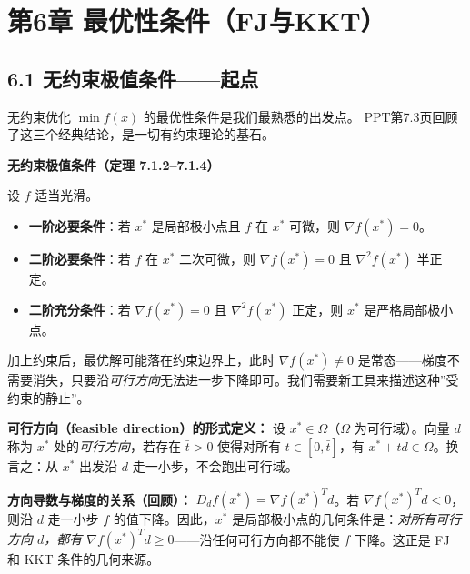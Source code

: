 \section{第6章 \quad 最优性条件（FJ与KKT）}

\subsection{6.1 无约束极值条件——起点}

无约束优化 $\min f(x)$ 的最优性条件是我们最熟悉的出发点。
PPT第7.3页回顾了这三个经典结论，是一切有约束理论的基石。

\medskip
{}
\medskip

\begin{defbox}
\textbf{无约束极值条件（定理 7.1.2--7.1.4）}

设 $f$ 适当光滑。
\begin{itemize}
  \item \textbf{一阶必要条件}：若 $x^*$ 是局部极小点且 $f$ 在 $x^*$ 可微，则 $\nabla f(x^*) = 0$。
  \item \textbf{二阶必要条件}：若 $f$ 在 $x^*$ 二次可微，则 $\nabla f(x^*)=0$ 且 $\nabla^2 f(x^*)$ 半正定。
  \item \textbf{二阶充分条件}：若 $\nabla f(x^*)=0$ 且 $\nabla^2 f(x^*)$ 正定，则 $x^*$ 是严格局部极小点。
\end{itemize}
\end{defbox}

加上约束后，最优解可能落在约束边界上，此时 $\nabla f(x^*) \neq 0$ 是常态——梯度不需要消失，只要沿\emph{可行方向}无法进一步下降即可。我们需要新工具来描述这种”受约束的静止”。

\smallskip
\textbf{可行方向（feasible direction）的形式定义：} 设 $x^*\in\Omega$（$\Omega$ 为可行域）。向量 $d$ 称为 $x^*$ 处的\emph{可行方向}，若存在 $\bar{t}>0$ 使得对所有 $t\in[0,\bar{t}]$，有 $x^*+td\in\Omega$。换言之：从 $x^*$ 出发沿 $d$ 走一小步，不会跑出可行域。

\textbf{方向导数与梯度的关系（回顾）：} $D_d f(x^*)=\nabla f(x^*)^T d$。若 $\nabla f(x^*)^T d < 0$，则沿 $d$ 走一小步 $f$ 的值下降。因此，$x^*$ 是局部极小点的几何条件是：\emph{对所有可行方向 $d$，都有 $\nabla f(x^*)^T d \ge 0$}——沿任何可行方向都不能使 $f$ 下降。这正是 FJ 和 KKT 条件的几何来源。

